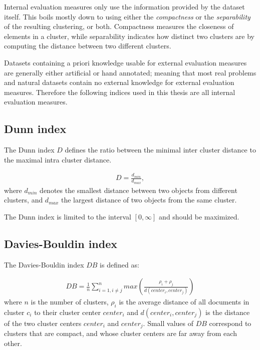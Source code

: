 Internal evaluation measures only use the information provided by the dataset itself. This boils mostly down to using either the \emph{compactness} or the \emph{separability} of the resulting clustering, or both.
%
Compactness measures the closeness of elements in a cluster, while separability indicates how distinct two clusters are by computing the distance between two different clusters.

Datasets containing a priori knowledge usable for external evaluation measures are generally either artificial or hand annotated; meaning that most real problems and natural datasets contain no external knowledge for external evaluation measures.  Therefore the following indices used in this thesis are all internal evaluation measures.

\subsection{Dunn index}
The Dunn index\cite{Dunn1973} $D$ defines the ratio between the minimal inter cluster distance to the maximal intra cluster distance.

\begin{align}
D = \frac{d_{min}}{d_{max}},
\end{align}
%
where $d_{min}$ denotes the smallest distance between two objects from different clusters, and $d_{max}$ the largest distance of two objects from the same cluster.

\vspace{.5em}
\noindent
The Dunn index is limited to the interval $[0, \infty]$ and should be maximized.


\subsection{Davies-Bouldin index}
The Davies-Bouldin index\cite{Davies1979} $DB$ is defined as:

\begin{align}
DB = \frac{1}{n} \sum^n_{i=1, i \neq j} max(\frac{\rho_i + \rho_j}{d(center_i, center_j)})
\end{align}
%
where $n$ is the number of clusters, $\rho_i$ is the average distance of all documents in cluster $c_i$ to their cluster center $center_i$ and $d(center_i, center_j)$ is the distance of the two cluster centers $center_i$ and $center_j$. Small values of $DB$ correspond to clusters that are compact, and whose cluster centers are far away from each other.

